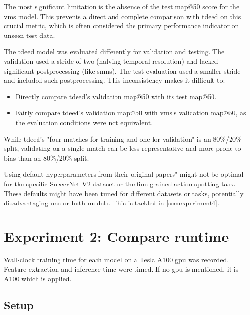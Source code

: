 The most significant limitation is the absence of the test \acrshort{map}@50 score for the \acrshort{vms} model. This prevents a direct and complete comparison with \acrshort{tdeed} on this crucial metric, which is often considered the primary performance indicator on unseen test data.

The \acrshort{tdeed} model was evaluated differently for validation and testing. The validation used a stride of two (halving temporal resolution) and lacked significant postprocessing (like \acrshort{snms}). The test evaluation used a smaller stride and included such postprocessing. This inconsistency makes it difficult to:

\begin{itemize}
    \item Directly compare \acrshort{tdeed}'s validation \acrshort{map}@50 with its test \acrshort{map}@50.
    \item Fairly compare \acrshort{tdeed}'s validation \acrshort{map}@50 with \acrshort{vms}'s validation \acrshort{map}@50, as the evaluation conditions were not equivalent.
\end{itemize}

While \acrshort{tdeed}'s "four matches for training and one for validation" is an 80\%/20\% split, validating on a single match can be less representative and more prone to bias than an 80\%/20\% split.

Using default hyperparameters from their original papers" might not be optimal for the specific SoccerNet-V2 dataset or the fine-grained action spotting task. These defaults might have been tuned for different datasets or tasks, potentially disadvantaging one or both models. This is tackled in \autoref{sec:experiment4}.



\section{Experiment 2: Compare runtime}
\label{sec:experiment2}

Wall-clock training time for each model on a Tesla A100 \acrshort{gpu} was recorded. Feature extraction and inference time were timed. If no \acrshort{gpu} is mentioned, it is A100 which is applied. 

\subsection{Setup}
\label{ssec:ex2_setup}

